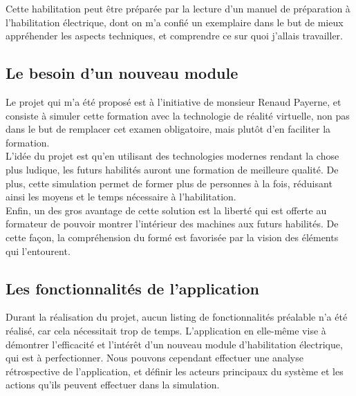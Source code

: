\documentclass[a4paper]{article}
\begin{document}
        Cette habilitation peut être préparée par la lecture d'un manuel de préparation à l'habilitation électrique, dont on m'a confié un exemplaire dans le but de mieux appréhender les aspects techniques, et comprendre ce sur quoi j'allais travailler.

        \vfill
    \subsection{Le besoin d'un nouveau module}

        Le projet qui m'a été proposé est à l'initiative de monsieur Renaud Payerne, et consiste à simuler cette formation avec la technologie de réalité virtuelle, non pas dans le but de remplacer cet examen obligatoire, mais plutôt d'en faciliter la formation. \\

        L'idée du projet est qu'en utilisant des technologies modernes rendant la chose plus ludique, les futurs habilités auront une formation de meilleure qualité. De plus, cette simulation permet de former plus de personnes à la fois, réduisant ainsi les moyens et le temps nécessaire à l'habilitation. \\   

        Enfin, un des gros avantage de cette solution est la liberté qui est offerte au formateur de pouvoir montrer l'intérieur des machines aux futurs habilités. De cette façon, la compréhension du formé est favorisée par la vision des éléments qui l'entourent. \\

        \vfill
        \newpage

    \subsection{Les fonctionnalités de l'application}

    Durant la réalisation du projet, aucun listing de fonctionnalités préalable n'a été réalisé, car cela nécessitait trop de temps. L'application en elle-même vise à démontrer l'efficacité et l'intérêt d'un nouveau module d'habilitation électrique, qui est à perfectionner. Nous pouvons cependant effectuer une analyse rétrospective de l'application, et définir les acteurs principaux du système et les actions qu'ils peuvent effectuer dans la simulation. \\
\end{document}
